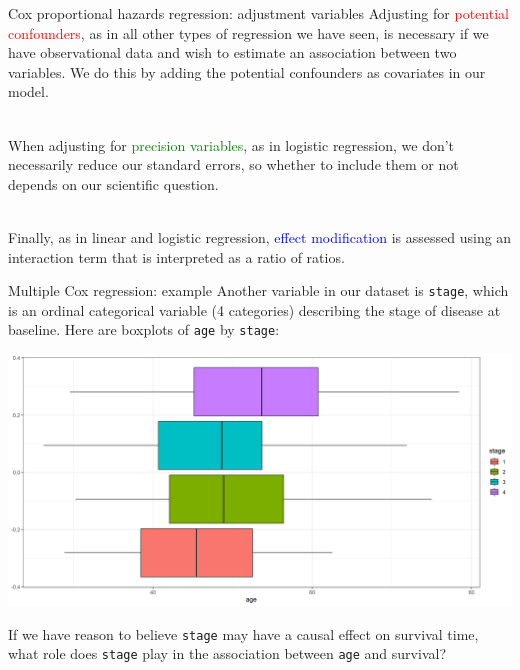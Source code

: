 \documentclass[10pt,t]{beamer}
\begin{document}
\begin{frame}{Cox proportional hazards regression: adjustment variables}
	Adjusting for \textcolor{red}{potential confounders}, as in all other types of regression we have seen, is necessary if we have observational data and wish to estimate an association between two variables. We do this by adding the potential confounders as covariates in our model.
	\\ ~\ 
	
	When adjusting for \textcolor{green}{precision variables}, as in logistic regression, we don't necessarily reduce our standard errors, so whether to include them or not depends on our scientific question. 
	\\ ~\ 
	
	Finally, as in linear and logistic regression, \textcolor{blue}{effect modification} is assessed using an interaction term that is interpreted as a ratio of ratios.
\end{frame}

\begin{frame}{Multiple Cox regression: example}
	\vspace{-0.6cm}
	Another variable in our dataset is \texttt{stage}, which is an ordinal categorical variable (4 categories) describing the stage of disease at baseline. Here are boxplots of \texttt{age} by \texttt{stage}: 
	\begin{center}
		\includegraphics[width = \textwidth]{figs/stage_by_age_box.png}
	\end{center}
	If we have reason to believe \texttt{stage} may have a causal effect on survival time, what role does \texttt{stage} play in the association between \texttt{age} and survival?
\end{frame}
\end{document}
